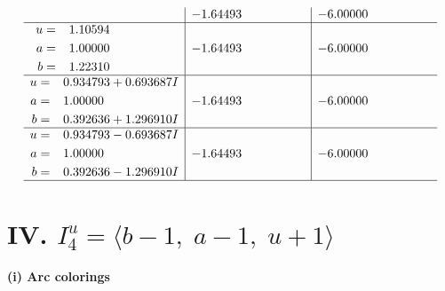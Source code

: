\documentclass[1p]{elsarticle_modified}
\theoremstyle{definition}
\begin{document}
$$\begin{array}{c|c|c}
 & -1.64493\phantom{ +0.000000I} & -6.00000\phantom{ +0.000000I} \\ \hline\begin{aligned}
u &= \phantom{-}1.10594\phantom{ +0.000000I} \\
a &= \phantom{-}1.00000\phantom{ +0.000000I} \\
b &= \phantom{-}1.22310\phantom{ +0.000000I}\end{aligned}
 & -1.64493\phantom{ +0.000000I} & -6.00000\phantom{ +0.000000I} \\ \hline\begin{aligned}
u &= \phantom{-}0.934793 + 0.693687 I \\
a &= \phantom{-}1.00000\phantom{ +0.000000I} \\
b &= \phantom{-}0.392636 + 1.296910 I\end{aligned}
 & -1.64493\phantom{ +0.000000I} & -6.00000\phantom{ +0.000000I} \\ \hline\begin{aligned}
u &= \phantom{-}0.934793 - 0.693687 I \\
a &= \phantom{-}1.00000\phantom{ +0.000000I} \\
b &= \phantom{-}0.392636 - 1.296910 I\end{aligned}
 & -1.64493\phantom{ +0.000000I} & -6.00000\phantom{ +0.000000I}\\
 \hline 
 \end{array}$$\newpage\newpage\renewcommand{\arraystretch}{1}
\centering \section*{IV. $I^u_{4}= \langle b-1,\;a-1,\;u+1 \rangle$}
\flushleft \textbf{(i) Arc colorings}\\
\end{document}
